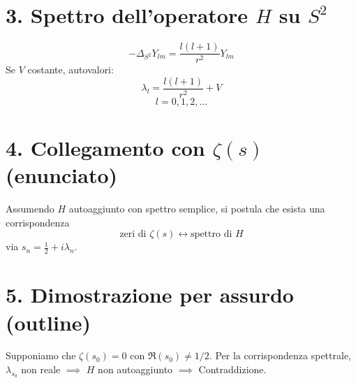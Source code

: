 \documentclass[12pt]{article}
\theoremstyle{definition}
\begin{document}
\section*{3. Spettro dell'operatore $H$ su $S^2$}

\[
-\Delta_{S^2} Y_{lm} = \frac{l(l+1)}{r^2} Y_{lm}
\]
Se $V$ costante, autovalori:
\[
\lambda_l = \frac{l(l+1)}{r^2} + V
\]
\[
l = 0,1,2,\dots
\]

\section*{4. Collegamento con $\zeta(s)$ (enunciato)}

Assumendo $H$ autoaggiunto con spettro semplice, si postula che esista una corrispondenza
\[
\text{zeri di } \zeta(s) \longleftrightarrow \text{spettro di } H
\]
via $s_n = \frac{1}{2} + i\lambda_n$.

\section*{5. Dimostrazione per assurdo (outline)}

Supponiamo che $\zeta(s_0)=0$ con $\Re(s_0)\neq 1/2$.  
Per la corrispondenza spettrale, $\lambda_{s_0}$ non reale $\implies$ $H$ non autoaggiunto $\implies$ Contraddizione.
\end{document}
